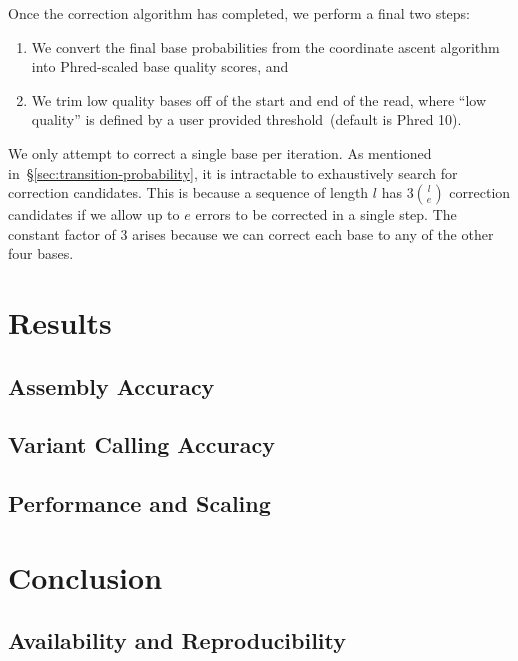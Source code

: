 \documentclass{llncs}
\begin{document}
Once the correction algorithm has completed, we perform a final two steps:

\begin{enumerate}
\item We convert the final base probabilities from the coordinate ascent algorithm into Phred-scaled
base quality scores, and
\item We trim low quality bases off of the start and end of the read, where ``low quality'' is defined by a
user provided threshold~(default is Phred 10).
\end{enumerate}

We only attempt to correct a single base per iteration. As mentioned
in~\S\ref{sec:transition-probability}, it is intractable to exhaustively search for correction candidates.
This is because a sequence of length $l$ has $3 {l \choose e}$ correction candidates if we allow up to
$e$ errors to be corrected in a single step. The constant factor of 3 arises because we can correct each 
base to any of the other four bases.

\section{Results}
\label{sec:results}

\subsection{Assembly Accuracy}
\label{sec:assembly}

\subsection{Variant Calling Accuracy}
\label{sec:variant-calling}

\subsection{Performance and Scaling}
\label{sec:performance}

\section{Conclusion}
\label{sec:conclusion}

\subsection{Availability and Reproducibility}
\label{sec:availability}
\end{document}
